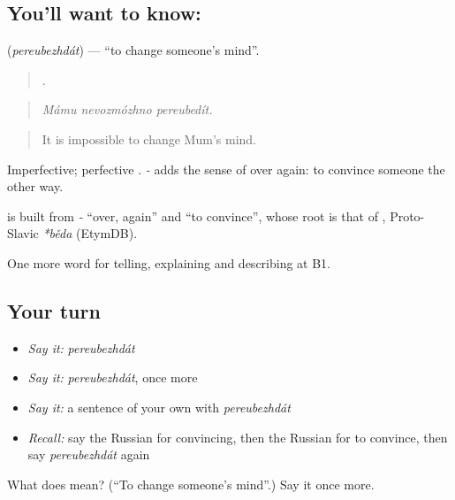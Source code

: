 \subsection*{You'll want to know: }
\textbf{} (\emph{pereubezhdát}) — \textquotedblleft{}to change someone’s mind\textquotedblright{}.

\begin{quote}
  .
\end{quote}

\begin{quote}
\emph{Mámu nevozmózhno pereubedít.}
\end{quote}

\begin{quote}
It is impossible to change Mum’s mind.
\end{quote}

Imperfective; perfective \emph{}. \emph{-} adds the sense of over again: to convince someone the other way.

\begin{cousinweb}
\textbf{} is built from \emph{-} \textquotedblleft{}over, again\textquotedblright{} and \emph{} \textquotedblleft{}to convince\textquotedblright{}, whose root is that of \emph{}, Proto-Slavic \emph{*běda} (EtymDB).
\end{cousinweb}

\begin{grammarlens}[title={What you've built}]
One more word for telling, explaining and describing at B1.
\end{grammarlens}

\subsection*{Your turn}
\begin{itemize}
\raggedright
  \item \emph{Say it:} \emph{pereubezhdát}
  \item \emph{Say it:} \emph{pereubezhdát}, once more
  \item \emph{Say it:} a sentence of your own with \emph{pereubezhdát}
  \item \emph{Recall:} say the Russian for convincing, then the Russian for to convince, then say \emph{pereubezhdát} again
\end{itemize}

\begin{tcolorbox}[breakable,colback=teal!4,colframe=teal!35!black,title={Before you move on}]
What does  mean? (\textquotedblleft{}To change someone’s mind\textquotedblright{}.) Say it once more.
\end{tcolorbox}
